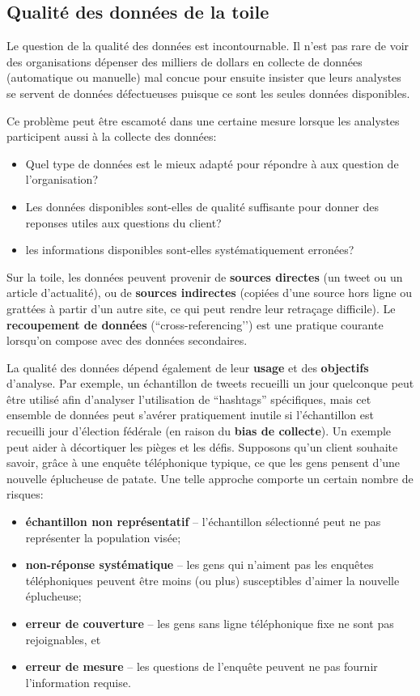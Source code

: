 \subsection{Qualité des données de la toile} Le question de la qualité des données est incontournable. Il n'est pas rare de voir des organisations dépenser des milliers de dollars en collecte de données (automatique ou manuelle) mal concue pour ensuite insister que leurs analystes se servent de données défectueuses puisque ce sont les seules données disponibles. \par Ce problème peut être escamoté dans une certaine mesure lorsque les analystes participent aussi à la collecte des données:
\begin{itemize}[noitemsep]
    \item Quel type de données est le mieux adapté pour répondre à aux question de l'organisation?
    \item Les données disponibles sont-elles de qualité suffisante pour donner des reponses utiles aux questions du client?
    \item les informations disponibles sont-elles systématiquement erronées?
\end{itemize}
Sur la toile, les données peuvent provenir de \textbf{sources directes} (un tweet ou un article d'actualité), ou de \textbf{sources indirectes} (copiées d'une source hors ligne ou grattées à partir d’un autre site, ce qui peut rendre leur retraçage difficile). Le \textbf{recoupement de données} (``cross-referencing’’) est une pratique courante lorsqu’on compose avec des données secondaires.  \par La qualité des données dépend également de leur \textbf{usage} et des \textbf{objectifs} d'analyse. Par exemple, 
un échantillon de tweets recueilli un jour quelconque peut être utilisé afin d'analyser l'utilisation de ``hashtags'' spécifiques, mais cet ensemble de données peut s’avérer pratiquement inutile si l’échantillon est recueilli jour d'élection fédérale (en raison du \textbf{bias de collecte}).
\newl Un exemple peut aider à décortiquer les pièges et les défis. Supposons qu'un client souhaite savoir, grâce à une enquête téléphonique typique, ce que les gens pensent d'une nouvelle éplucheuse de patate.  Une telle approche comporte un certain nombre de risques:
\begin{itemize}[noitemsep]
\item\textbf{échantillon non représentatif} -- l'échantillon sélectionné peut ne pas représenter la population visée;
\item\textbf{non-réponse systématique} -- les gens qui n'aiment pas les enquêtes télépho\-ni\-ques peuvent être moins (ou plus) susceptibles d'aimer la nouvelle  éplucheuse;  
\item\textbf{erreur de couverture} -- les gens sans ligne télépho\-ni\-que fixe ne sont pas rejoignables, et \item\textbf{erreur de mesure} -- les questions de l'enquête peuvent ne pas fournir l'information requise.
\end{itemize}
